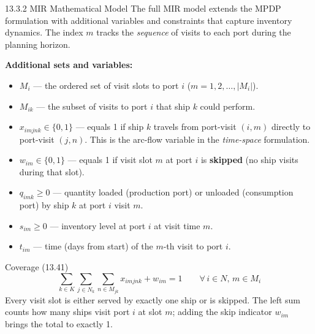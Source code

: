 \documentclass[aspectratio=169,10pt]{beamer}
\begin{document}
\begin{frame}[allowframebreaks]{13.3.2 MIR Mathematical Model}
  The full MIR model extends the MPDP formulation with additional variables
  and constraints that capture inventory dynamics.  The index $m$ tracks
  the \emph{sequence} of visits to each port during the planning horizon.

  \medskip
  \textbf{Additional sets and variables:}
  \begin{itemize}
    \item $M_i$ --- the ordered set of visit slots to port $i$
          ($m = 1, 2, \ldots, |M_i|$).
    \item $M_{ik}$ --- the subset of visits to port $i$ that ship $k$ could perform.
    \item $x_{imjnk} \in \{0,1\}$ --- equals 1 if ship $k$ travels from
          port-visit $(i,m)$ directly to port-visit $(j,n)$.  This is the
          arc-flow variable in the \emph{time-space} formulation.
    \item $w_{im} \in \{0,1\}$ --- equals 1 if visit slot $m$ at port $i$
          is \textbf{skipped} (no ship visits during that slot).
    \item $q_{imk} \geq 0$ --- quantity loaded (production port) or unloaded
          (consumption port) by ship $k$ at port $i$ visit $m$.
    \item $s_{im} \geq 0$ --- inventory level at port $i$ at visit time $m$.
    \item $t_{im}$ --- time (days from start) of the $m$-th visit to port $i$.
  \end{itemize}

  \begin{block}{Coverage (13.41)}
    \begin{equation}
      \sum_{k \in K} \sum_{j \in N_k} \sum_{n \in M_{jk}} x_{imjnk} + w_{im} = 1
      \qquad \forall\, i \in N,\, m \in M_i
      \tag{13.41}
    \end{equation}
    Every visit slot is either served by exactly one ship or is skipped.
    The left sum counts how many ships visit port $i$ at slot $m$; adding
    the skip indicator $w_{im}$ brings the total to exactly 1.
  \end{block}


\end{frame}
\end{document}
